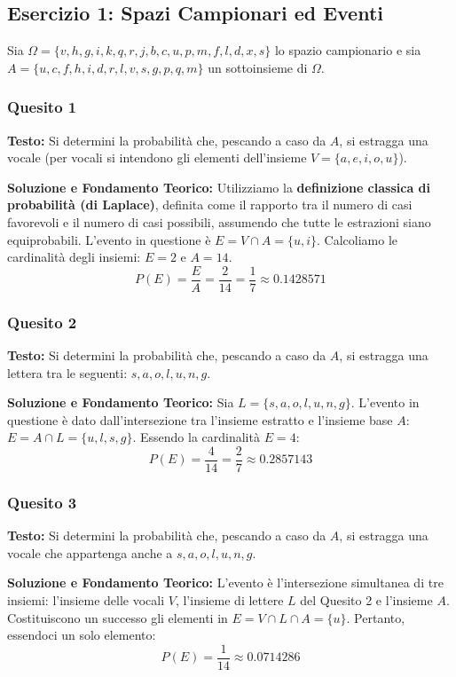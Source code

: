 \documentclass[12pt, a4paper]{article}
\begin{document}
\subsection*{Esercizio 1: Spazi Campionari ed Eventi}
Sia $\Omega=\{v,h,g,i,k,q,r,j,b,c,u,p,m,f,l,d,x,s\}$ lo spazio campionario e sia \\ $A=\{u,c,f,h,i,d,r,l,v,s,g,p,q,m\}$ un sottoinsieme di $\Omega$.

\subsubsection*{Quesito 1}
\textbf{Testo:} Si determini la probabilità che, pescando a caso da $A$, si estragga una vocale (per vocali si intendono gli elementi dell'insieme $V=\{a,e,i,o,u\}$).

\textbf{Soluzione e Fondamento Teorico:} 
Utilizziamo la \textbf{definizione classica di probabilità (di Laplace)}, definita come il rapporto tra il numero di casi favorevoli e il numero di casi possibili, assumendo che tutte le estrazioni siano equiprobabili. 
L'evento in questione è $E = V \cap A = \{u, i\}$. 
Calcoliamo le cardinalità degli insiemi: $E = 2$ e $A = 14$.
$$ P(E) = \frac{E}{A} = \frac{2}{14} = \frac{1}{7} \approx 0.1428571 $$

\subsubsection*{Quesito 2}
\textbf{Testo:} Si determini la probabilità che, pescando a caso da $A$, si estragga una lettera tra le seguenti: $s, a, o, l, u, n, g$.

\textbf{Soluzione e Fondamento Teorico:} 
Sia $L = \{s,a,o,l,u,n,g\}$. L'evento in questione è dato dall'intersezione tra l'insieme estratto e l'insieme base $A$: $E = A \cap L = \{u,l,s,g\}$.
Essendo la cardinalità $E = 4$:
$$ P(E) = \frac{4}{14} = \frac{2}{7} \approx 0.2857143 $$

\subsubsection*{Quesito 3}
\textbf{Testo:} Si determini la probabilità che, pescando a caso da $A$, si estragga una vocale che appartenga anche a $s, a, o, l, u, n, g$.

\textbf{Soluzione e Fondamento Teorico:} 
L'evento è l'intersezione simultanea di tre insiemi: l'insieme delle vocali $V$, l'insieme di lettere $L$ del Quesito 2 e l'insieme $A$. Costituiscono un successo gli elementi in $E = V \cap L \cap A = \{u\}$. Pertanto, essendoci un solo elemento:
$$ P(E) = \frac{1}{14} \approx 0.0714286 $$
\end{document}
